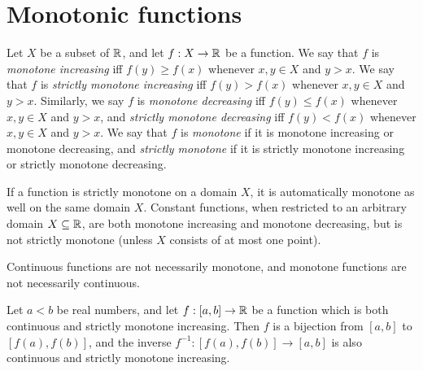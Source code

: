 \section{Monotonic functions}\label{i:sec:9.8}

\begin{defn}\label{i:9.8.1}
  Let \(X\) be a subset of \(\mathbb{R}\), and let \(f : X \to \mathbb{R}\) be a function.
  We say that \(f\) is \emph{monotone increasing} iff \(f(y) \geq f(x)\) whenever \(x, y \in X\) and \(y > x\).
  We say that \(f\) is \emph{strictly monotone increasing} iff \(f(y) > f(x)\) whenever \(x, y \in X\) and \(y > x\).
  Similarly, we say \(f\) is \emph{monotone decreasing} iff \(f(y) \leq f(x)\) whenever \(x, y \in X\) and \(y > x\), and \emph{strictly monotone decreasing} iff \(f(y) < f(x)\) whenever \(x, y \in X\) and \(y > x\).
  We say that \(f\) is \emph{monotone} if it is monotone increasing or monotone decreasing, and \emph{strictly monotone} if it is strictly monotone increasing or strictly monotone decreasing.
\end{defn}

\begin{note}
  If a function is strictly monotone on a domain \(X\), it is automatically monotone as well on the same domain \(X\).
  Constant functions, when restricted to an arbitrary domain \(X \subseteq \mathbb{R}\), are both monotone increasing and monotone decreasing, but is not strictly monotone
  (unless \(X\) consists of at most one point).
\end{note}

\begin{note}
  Continuous functions are not necessarily monotone, and monotone functions are not necessarily continuous.
\end{note}

\setcounter{thm}{2}
\begin{prop}\label{i:9.8.3}
  Let \(a < b\) be real numbers, and let \(f : [a, b] \to \mathbb{R}\) be a function which is both continuous and strictly monotone increasing.
  Then \(f\) is a bijection from \([a, b]\) to \([f(a), f(b)]\), and the inverse \(f^{-1} : [f(a), f(b)] \to [a, b]\) is also continuous and strictly monotone increasing.
\end{prop}


